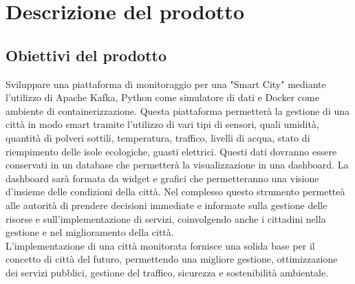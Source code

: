 \section{Descrizione del prodotto}
\subsection{Obiettivi del prodotto}
Sviluppare una piattaforma di monitoraggio per una "Smart City" mediante l'utilizzo di Apache Kafka, Python come simulatore di dati e Docker come ambiente di containerizzazione. Questa piattaforma permetterà la gestione di una città in modo smart tramite l'utilizzo di vari tipi di sensori, quali umidità, quantità di polveri sottili, temperatura, traffico, livelli di acqua, stato di riempimento delle isole ecologiche, guasti elettrici. Questi dati dovranno essere conservati in un database che permetterà la visualizzazione in una dashboard. La dashboard sarà formata da widget e grafici che permetteranno una visione d'insieme delle condizioni della città. Nel complesso questo strumento permetteà alle autorità di prendere decisioni immediate e informate sulla gestione delle risorse e sull'implementazione di servizi, coinvolgendo anche i cittadini nella gestione e nel miglioramento della città.\\ 
L'implementazione di una città monitorata fornisce una solida base per il concetto di città del futuro, permettendo una migliore gestione, ottimizzazione dei servizi pubblici, gestione del traffico, sicurezza e sostenibilità ambientale.
